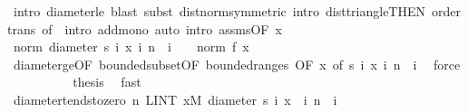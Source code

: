 \begin{isabellebody}
\ {\isacharparenleft}{\kern0pt}intro\ diameter{\isacharunderscore}{\kern0pt}le{\isacharcomma}{\kern0pt}\ blast{\isacharcomma}{\kern0pt}\ subst\ dist{\isacharunderscore}{\kern0pt}norm{\isacharbrackleft}{\kern0pt}symmetric{\isacharbrackright}{\kern0pt}{\isacharcomma}{\kern0pt}\ intro\ dist{\isacharunderscore}{\kern0pt}triangle{}{\isacharbrackleft}{\kern0pt}THEN\ order{\isacharunderscore}{\kern0pt}trans{\isacharcomma}{\kern0pt}\ of\ {}{\isacharbrackright}{\kern0pt}{\isacharcomma}{\kern0pt}\ intro\ add{\isacharunderscore}{\kern0pt}mono{\isacharparenright}{\kern0pt}\ {\isacharparenleft}{\kern0pt}auto\ intro{\isacharcolon}{\kern0pt}\ assms{\isacharparenleft}{\kern0pt}{}{\isacharparenright}{\kern0pt}{\isacharbrackleft}{\kern0pt}OF\ x{\isacharbrackright}{\kern0pt}{\isacharparenright}{\kern0pt}\isanewline
\ \ \ \ \ \ \isamarkupfalse%
\ {\isachardoublequoteopen}norm\ {\isacharparenleft}{\kern0pt}diameter\ {\isacharbraceleft}{\kern0pt}s\ i\ x\ {\isacharbar}{\kern0pt}i{\isachardot}{\kern0pt}\ n\ {\isasymle}\ i{\isacharbraceright}{\kern0pt}{\isacharparenright}{\kern0pt}\ {\isasymle}\ {}\ {\isacharasterisk}{\kern0pt}\ norm\ {\isacharparenleft}{\kern0pt}f\ x{\isacharparenright}{\kern0pt}{\isachardoublequoteclose}\ \isamarkupfalse%
\ diameter{\isacharunderscore}{\kern0pt}ge{\isacharunderscore}{\kern0pt}{}{\isacharbrackleft}{\kern0pt}OF\ bounded{\isacharunderscore}{\kern0pt}subset{\isacharbrackleft}{\kern0pt}OF\ bounded{\isacharunderscore}{\kern0pt}range{\isacharunderscore}{\kern0pt}s{\isacharbrackright}{\kern0pt}{\isacharcomma}{\kern0pt}\ OF\ x{\isacharcomma}{\kern0pt}\ of\ {\isachardoublequoteopen}{\isacharbraceleft}{\kern0pt}s\ i\ x\ {\isacharbar}{\kern0pt}i{\isachardot}{\kern0pt}\ n\ {\isasymle}\ i{\isacharbraceright}{\kern0pt}{\isachardoublequoteclose}{\isacharbrackright}{\kern0pt}\ \isamarkupfalse%
\ force\isanewline
\ \ \ \ \isacommand{{\isacharbraceright}{\kern0pt}}\isamarkupfalse%
\isanewline
\ \ \ \ \isamarkupfalse%
\ {\isacharquery}{\kern0pt}thesis\ \isamarkupfalse%
\ fast\isanewline
\ \ \isamarkupfalse%
\isanewline
\ \ \isamarkupfalse%
\ \isamarkupfalse%
\ diameter{\isacharunderscore}{\kern0pt}tendsto{\isacharunderscore}{\kern0pt}zero{\isacharcolon}{\kern0pt}\ {\isachardoublequoteopen}{\isacharparenleft}{\kern0pt}{\isasymlambda}n{\isachardot}{\kern0pt}\ LINT\ x{\isacharbar}{\kern0pt}M{\isachardot}{\kern0pt}\ diameter\ {\isacharbraceleft}{\kern0pt}s\ i\ x\ {\isacharbar}{\kern0pt}\ i{\isachardot}{\kern0pt}\ n\ {\isasymle}\ i{\isacharbraceright}{\kern0pt}{\isacharparenright}{\kern0pt}\ {\isasymlonglonglongrightarrow}\ {}{\isachardoublequoteclose}\ \isamarkupfalse%

\end{isabellebody}
